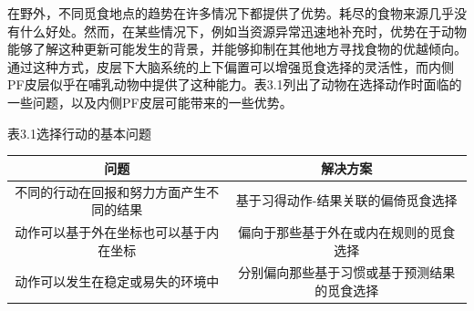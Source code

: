 在野外，不同觅食地点的趋势在许多情况下都提供了优势。耗尽的食物来源几乎没有什么好处。然而，在某些情况下，例如当资源异常迅速地补充时，优势在于动物能够了解这种更新可能发生的背景，并能够抑制在其他地方寻找食物的优越倾向。通过这种方式，皮层下大脑系统的上下偏置可以增强觅食选择的灵活性，而内侧PF皮层似乎在哺乳动物中提供了这种能力。表3.1列出了动物在选择动作时面临的一些问题，以及内侧PF皮层可能带来的一些优势。\par

表3.1选择行动的基本问题\par
\begin{tabular}{c c }	 %
	\hline	%
	问题 & 解决方案 \\	
	\hline  %
	不同的行动在回报和努力方面产生不同的结果 & 基于习得动作-结果关联的偏倚觅食选择 \\
	\hline
	动作可以基于外在坐标也可以基于内在坐标 & 偏向于那些基于外在或内在规则的觅食选择 \\
	\hline
	动作可以发生在稳定或易失的环境中 & 分别偏向那些基于习惯或基于预测结果的觅食选择 \\
	\hline
\end{tabular}

